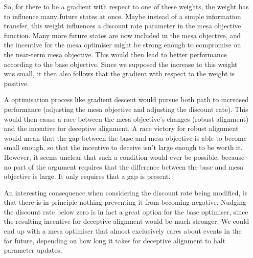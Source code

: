 So, for there to be a gradient with respect to one of these weights, the weight has to influence many future states at
once.
Maybe instead of a simple information transfer, this weight influences a discount rate parameter in the mesa objective
function.
Many more future states are now included in the mesa objective, and the incentive for the mesa optimiser might be strong
enough to compromise on the near-term mesa objective.
This would then lead to better performance according to the base objective.
Since we supposed the increase to this weight was small, it then also follows that the gradient with respect to the
weight is positive.

A optimisation process like gradient descent would pursue both path to increased performance
(adjusting the mesa objective and adjusting the discount rate).
This would then cause a race between the mesa objective's changes (robust alignment) and the incentive for deceptive
alignment.
A race victory for robust alignment would mean that the gap between the base and mesa objective is able to become
small enough, so that the incentive to deceive isn't large enough to be worth it.
However, it seems unclear that such a condition would ever be possible, because no part of the argument requires
that the difference between the base and mesa objective is large.
It only requires that a gap is present.

An interesting consequence when considering the discount rate being modified, is that there is in principle nothing
preventing it from becoming negative.
Nudging the discount rate below zero is in fact a great option for the base optimiser, since the resulting incentive
for deceptive alignment would be much stronger.
We could end up with a mesa optimiser that almost exclusively cares about events in the far future, depending on how
long it takes for deceptive alignment to halt parameter updates.

